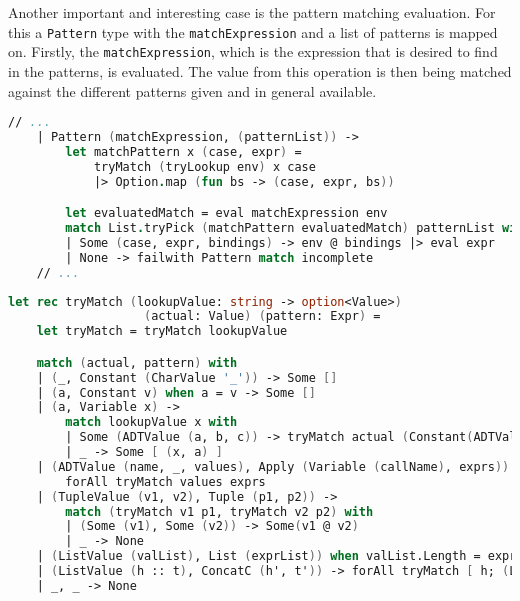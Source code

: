 Another important and interesting case is the pattern matching evaluation. For this a \texttt{Pattern} type with the \texttt{matchExpression} and a list of patterns is mapped on.
Firstly, the \texttt{matchExpression}, which is the expression that is desired to find in the patterns, is evaluated. The value from this operation is then being matched against the different patterns given and in general available.

\begin{lstlisting}[columns=fullflexible, label={interpreter-pattern}, language=FSharp, caption={Evaluation of pattern matching}]
    // ...
    | Pattern (matchExpression, (patternList)) ->
        let matchPattern x (case, expr) =
            tryMatch (tryLookup env) x case
            |> Option.map (fun bs -> (case, expr, bs))

        let evaluatedMatch = eval matchExpression env
        match List.tryPick (matchPattern evaluatedMatch) patternList with
        | Some (case, expr, bindings) -> env @ bindings |> eval expr
        | None -> failwith Pattern match incomplete
    // ...
\end{lstlisting}

\begin{lstlisting}[columns=fullflexible, label={interpreter-pattern_match}, language=FSharp, caption={Helper function to find pattern and bind values}]
let rec tryMatch (lookupValue: string -> option<Value>)
                   (actual: Value) (pattern: Expr) =
    let tryMatch = tryMatch lookupValue

    match (actual, pattern) with
    | (_, Constant (CharValue '_')) -> Some []
    | (a, Constant v) when a = v -> Some []
    | (a, Variable x) ->
        match lookupValue x with
        | Some (ADTValue (a, b, c)) -> tryMatch actual (Constant(ADTValue(a, b, c)))
        | _ -> Some [ (x, a) ]
    | (ADTValue (name, _, values), Apply (Variable (callName), exprs)) when name = callName ->
        forAll tryMatch values exprs
    | (TupleValue (v1, v2), Tuple (p1, p2)) ->
        match (tryMatch v1 p1, tryMatch v2 p2) with
        | (Some (v1), Some (v2)) -> Some(v1 @ v2)
        | _ -> None
    | (ListValue (valList), List (exprList)) when valList.Length = exprList.Length -> forAll tryMatch valList exprList
    | (ListValue (h :: t), ConcatC (h', t')) -> forAll tryMatch [ h; (ListValue t) ] [ h'; t' ]
    | _, _ -> None
\end{lstlisting}

